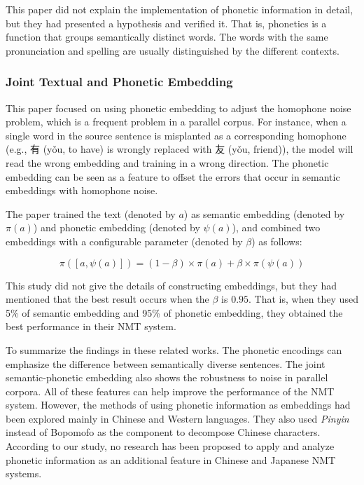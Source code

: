 This paper did not explain the implementation of phonetic information in detail, but they had presented a hypothesis and verified it. That is, phonetics is a function that groups semantically distinct words. The words with the same pronunciation and spelling are usually distinguished by the different contexts.

\newpage

\subsubsection{Joint Textual and Phonetic Embedding}

This paper \cite{liu-etal-2019-robust} focused on using phonetic embedding to adjust the homophone noise problem, which is a frequent problem in a parallel corpus. For instance, when a single word in the source sentence is misplanted as a corresponding homophone (e.g., 有 (yǒu, to have) is wrongly replaced with 友 (yǒu, friend)), the model will read the wrong embedding and training in a wrong direction. The phonetic embedding can be seen as a feature to offset the errors that occur in semantic embeddings with homophone noise.

The paper trained the text (denoted by $a$) as semantic embedding (denoted by $\pi(a)$) and phonetic embedding (denoted by $\psi(a)$), and combined two embeddings with a configurable parameter (denoted by $\beta$) as follows:

\begin{equation}
	\pi([a, \psi(a)]) = (1-\beta) \times \pi(a) + \beta \times \pi(\psi(a)) 
\end{equation}

This study did not give the details of constructing embeddings, but they had mentioned that the best result occurs when the $\beta$ is $0.95$. That is, when they used 5\% of semantic embedding and 95\% of phonetic embedding, they obtained the best performance in their NMT system.

To summarize the findings in these related works. The phonetic encodings can emphasize the difference between semantically diverse sentences. The joint semantic-phonetic embedding also shows the robustness to noise in parallel corpora. All of these features can help improve the performance of the NMT system. However, the methods of using phonetic information as embeddings had been explored mainly in Chinese and Western languages. They also used \textit{Pinyin} instead of Bopomofo as the component to decompose Chinese characters. According to our study, no research has been proposed to apply and analyze phonetic information as an additional feature in Chinese and Japanese NMT systems.
